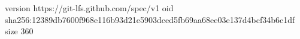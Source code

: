 version https://git-lfs.github.com/spec/v1
oid sha256:12389db7600f968e116b93d21e5903dced5fb69aa68ee03e137d4bcf34b6c1df
size 360
